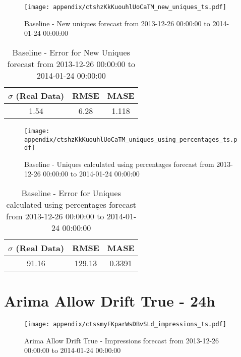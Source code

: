 \begin{figure}[H] \begin{center} \leavevmode
\texttt{[image: appendix/ctshzKkKuouhlUoCaTM\_new\_uniques\_ts.pdf]} \caption[]{
Baseline - New uniques forecast from 2013-12-26 00:00:00 to 2014-01-24 00:00:00} \label{fig:appendix/ctshzKkKuouhlUoCaTM_new_uniques_ts.pdf} \end{center}
\end{figure}

\begin{table}[H]
\centering
\footnotesize
\begin{tabular}{ccc}
$\sigma$ (Real Data) & RMSE & MASE   \\ \hline
1.54 & 6.28 & 1.118 \\
\end{tabular}

\vspace{0.5cm}

\caption[]{
Baseline - Error for New Uniques forecast from 2013-12-26 00:00:00 to 2014-01-24 00:00:00}
\end{table}

\begin{figure}[H] \begin{center} \leavevmode
\texttt{[image: appendix/ctshzKkKuouhlUoCaTM\_uniques\_using\_percentages\_ts.pdf]} \caption[]{
Baseline - Uniques calculated using percentages forecast from 2013-12-26 00:00:00 to 2014-01-24 00:00:00} \label{fig:appendix/ctshzKkKuouhlUoCaTM_uniques_using_percentages_ts.pdf} \end{center}
\end{figure}

\begin{table}[H]
\centering
\footnotesize
\begin{tabular}{ccc}
$\sigma$ (Real Data) & RMSE & MASE   \\ \hline
91.16 & 129.13 & 0.3391 \\
\end{tabular}

\vspace{0.5cm}

\caption[]{
Baseline - Error for Uniques calculated using percentages forecast from 2013-12-26 00:00:00 to 2014-01-24 00:00:00}
\end{table}

\section{Arima Allow Drift True - 24h}
\begin{figure}[H] \begin{center} \leavevmode
\texttt{[image: appendix/ctssmyFKparWsDBvSLd\_impressions\_ts.pdf]} \caption[]{
Arima Allow Drift True - Impressions forecast from 2013-12-26 00:00:00 to 2014-01-24 00:00:00} \label{fig:appendix/ctssmyFKparWsDBvSLd_impressions_ts.pdf} \end{center}
\end{figure}

